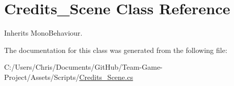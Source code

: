 \hypertarget{class_credits___scene}{}\section{Credits\+\_\+\+Scene Class Reference}
\label{class_credits___scene}


Inherits Mono\+Behaviour.



The documentation for this class was generated from the following file\+:\begin{DoxyCompactItemize}
\item 
C\+:/\+Users/\+Chris/\+Documents/\+Git\+Hub/\+Team-\/\+Game-\/\+Project/\+Assets/\+Scripts/\hyperlink{_credits___scene_8cs}{Credits\+\_\+\+Scene.\+cs}\end{DoxyCompactItemize}
